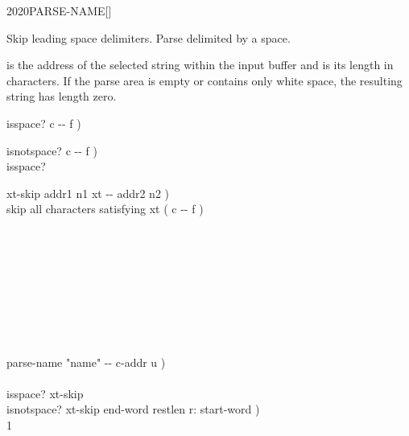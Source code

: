 \begin{worddef}{2020}{PARSE-NAME}[]%
\item {}

	Skip leading space delimiters. Parse  delimited by a
	space.

	 is the address of the selected string within the
	input buffer and  is its length in characters. If the
	parse area is empty or contains only white space, the resulting
	string has length zero.

	\begin{implement} %
		\word{:} isspace?  c -{}- f ) \\
		\tab {}   \word{;}

		\word{:} isnotspace?  c -{}- f ) \\
		\tab isspace?  \word{;}

		\word{:} xt-skip  addr1 n1 xt -{}- addr2 n2 ) \\
		\tab {} skip all characters satisfying xt ( c -{}- f ) \\
		\tab {} \\
		\tab {} \\
		\tab[2]  \\
		\tab {} \\
		\tab[2]     \\
		\tab {} \\
		  \\
		\tab {}  \\
		\tab {}  \word{;}

		\word{:} parse-name  "name" -{}- c-addr u ) \\
		\tab {}    \\
		\tab \word{[']} isspace? xt-skip   \\
		\tab \word{[']} isnotspace? xt-skip  end-word restlen r: start-word ) \\
		\tab {} 1  \word{+}   \word{-}  \word{!} \\
		\tab {}   \word{-} \word{;}
	\end{implement}

	\begin{testing} %
		 \\


\end{testing}
\end{worddef}
